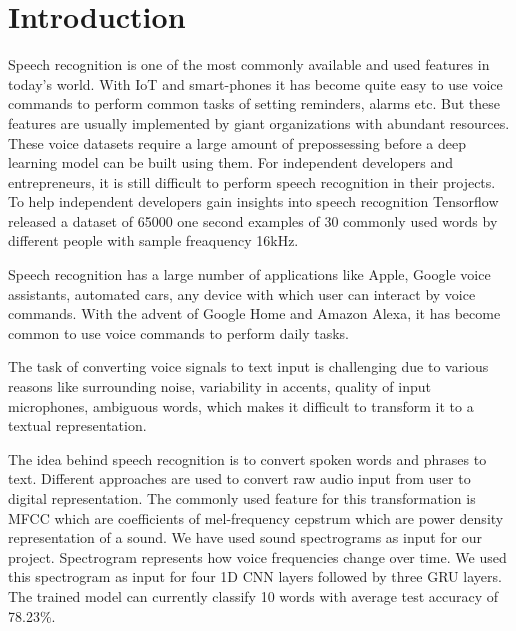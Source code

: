 \section{Introduction}
Speech recognition is one of the most commonly available and used features in today's world. With IoT and smart-phones it has become quite easy to use voice commands to perform common tasks of setting reminders, alarms etc. But these features are usually implemented by giant organizations with abundant resources. These voice datasets require a large amount of prepossessing before a deep learning model can be built using them. For independent developers and entrepreneurs, it is still difficult to perform speech recognition in their projects. To help independent developers gain insights into speech recognition Tensorflow released a dataset of 65000 one second examples of 30 commonly used words by different people with sample freaquency 16kHz.
\par Speech recognition has a large number of applications like Apple, Google voice assistants, automated cars, any device with which user can interact by voice commands. With the advent of Google Home and Amazon Alexa, it has become common to use voice commands to perform daily tasks.
\par The task of converting voice signals to text input is challenging due to various reasons like surrounding noise, variability in accents, quality of input microphones, ambiguous words, which makes it difficult to transform it to a textual representation.
\par The idea behind speech recognition is to convert spoken words and phrases to text. Different approaches are used to convert raw audio input from user to digital representation. The commonly used feature for this transformation is MFCC which are coefficients of mel-frequency cepstrum which are power density representation of a sound. We have used sound spectrograms as input for our project. Spectrogram represents how voice frequencies change over time.
We used this spectrogram as input for four 1D CNN layers followed by three GRU layers. The trained model can currently classify 10 words with average test accuracy of 78.23\%.
